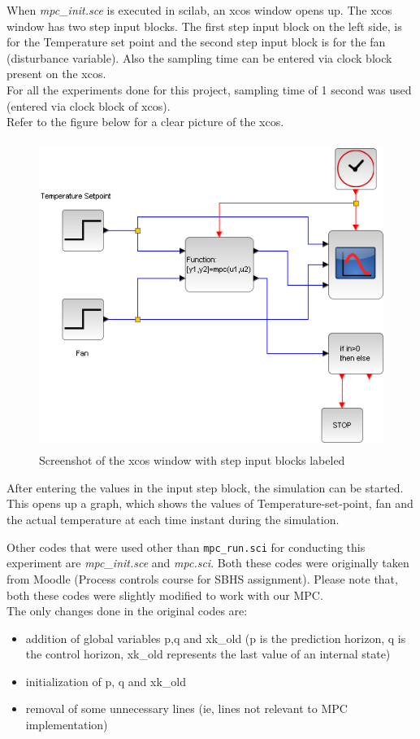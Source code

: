 When \emph{mpc\_init.sce} is executed in scilab, an xcos window opens up. The xcos window has two step input blocks. The first step input block on the left side, is for the Temperature set point and the second step input block is for the fan (disturbance variable). Also the sampling time can be entered via clock block present on the xcos. \\
For all the experiments done for this project, sampling time of 1 second was used (entered via clock block of xcos). \\
Refer to the figure below for a clear picture of the xcos.
\begin{figure}[H]
\centering
  \includegraphics[width=12cm, height=10cm]{mpc/mpc_xcos.png}
  \caption{Screenshot of the xcos window with step input blocks labeled}
\end{figure}
After entering the values in the input step block, the simulation can be started. This opens up a graph, which shows the values of Temperature-set-point, fan and the actual temperature at each time instant during the simulation.

Other codes that were used other than {\tt mpc\_run.sci} for conducting this experiment are \emph{mpc\_init.sce} and \emph{mpc.sci}. Both these codes were originally taken from Moodle (Process controls course for SBHS assignment). Please note that, both these codes were slightly modified to work with our MPC. \\
The only changes done in the original codes are: 
\begin{itemize}
\item addition of global variables p,q and xk\_old (p is the prediction horizon, q is the control horizon, xk\_old represents the last value of an internal state)
\item initialization of p, q and xk\_old
\item removal of some unnecessary lines (ie, lines not relevant to MPC implementation)
\end{itemize}



